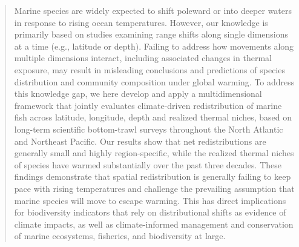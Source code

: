 \documentclass[9pt,twocolumn,twoside]{pnas-new}
\begin{document}

\begin{abstract}
Marine species are widely expected to shift poleward or into deeper waters in response to rising ocean temperatures. However, our knowledge is primarily based on studies examining range shifts along single dimensions at a time (e.g., latitude or depth). Failing to address how movements along multiple dimensions interact, including associated changes in thermal exposure, may result in misleading conclusions and predictions of species distribution and community composition under global warming. To address this knowledge gap, we here develop and apply a multidimensional framework that jointly evaluates climate-driven redistribution of marine fish across latitude, longitude, depth and realized thermal niches, based on long-term scientific bottom-trawl surveys throughout the North Atlantic and Northeast Pacific. Our results show that net redistributions are generally small and highly region-specific, while the realized thermal niches of species have warmed substantially over the past three decades. These findings demonstrate that spatial redistribution is generally failing to keep pace with rising temperatures and challenge the prevailing assumption that marine species will move to escape warming. This has direct implications for biodiversity indicators that rely on distributional shifts as evidence of climate impacts, as well as climate-informed management and conservation of marine ecosystems, fisheries, and biodiversity at large.
\end{abstract}



\maketitle
\thispagestyle{firststyle}

\Firstpage

\end{document}
